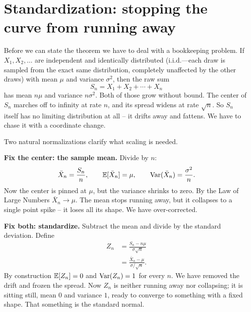\section{Standardization: stopping the curve from running away}
\label{ch21:standardization}

Before we can state the theorem we have to deal with a bookkeeping problem. If
$X_1, X_2, \dots$ are independent and identically distributed (i.i.d.---each draw is
sampled from the exact same distribution, completely unaffected by the other draws) with
mean $\mu$ and variance $\sigma^2$, then the raw sum
\[
  S_n = X_1 + X_2 + \cdots + X_n
\]
has mean $n\mu$ and variance $n\sigma^2$. Both of those grow without bound. The center
of $S_n$ marches off to infinity at rate $n$, and its spread widens at rate $\sqrt{n}$.
So $S_n$ itself has no limiting distribution at all -- it drifts away and fattens.
We have to chase it with a coordinate change.

Two natural normalizations clarify what scaling is needed.

\textbf{Fix the center: the sample mean.} Divide by $n$:
\[
  \bar X_n = \frac{S_n}{n}, \qquad \operatorname{\mathbb{E}}[\bar X_n] = \mu, \qquad \operatorname{Var}(\bar X_n) = \frac{\sigma^2}{n}.
\]
Now the center is pinned at $\mu$, but the variance shrinks to zero. By the Law of Large
Numbers $\bar X_n \to \mu$. The mean stops running away, but it collapses to a single
point spike -- it loses all its shape. We have over-corrected.

\textbf{Fix both: standardize.} Subtract the mean and divide by the standard deviation.
Define
\begin{align*}
  Z_n &= \frac{S_n - n\mu}{\sigma\sqrt{n}} \\
      &= \frac{\bar X_n - \mu}{\sigma/\sqrt{n}}.
\end{align*}
By construction $\operatorname{\mathbb{E}}[Z_n] = 0$ and $\operatorname{Var}(Z_n) = 1$ for every $n$. We have removed the
drift and frozen the spread. Now $Z_n$ is neither running away nor collapsing; it is
sitting still, mean $0$ and variance $1$, ready to converge to something with a fixed
shape. That something is the standard normal.


